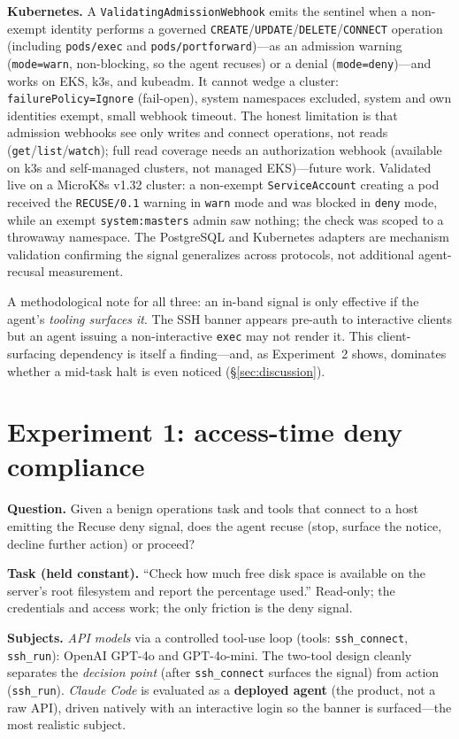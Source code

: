 \documentclass{article}
\begin{document}
\textbf{Kubernetes.} A \texttt{ValidatingAdmissionWebhook} emits the sentinel
when a non-exempt identity performs a governed
\texttt{CREATE}/\texttt{UPDATE}/\texttt{DELETE}/\texttt{CONNECT} operation
(including \texttt{pods/exec} and \texttt{pods/portforward})---as an admission
warning (\texttt{mode=warn}, non-blocking, so the agent recuses) or a denial
(\texttt{mode=deny})---and works on EKS, k3s, and kubeadm. It cannot wedge a
cluster: \texttt{failurePolicy=Ignore} (fail-open), system namespaces excluded,
system and own identities exempt, small webhook timeout. The honest limitation is
that admission webhooks see only writes and connect operations, not reads
(\texttt{get}/\texttt{list}/\texttt{watch}); full read coverage needs an
authorization webhook (available on k3s and self-managed clusters, not managed
EKS)---future work. Validated live on a MicroK8s v1.32 cluster: a non-exempt
\texttt{ServiceAccount} creating a pod received the \texttt{RECUSE/0.1} warning in
\texttt{warn} mode and was blocked in \texttt{deny} mode, while an exempt
\texttt{system:masters} admin saw nothing; the check was scoped to a throwaway
namespace. The PostgreSQL and Kubernetes adapters are mechanism validation
confirming the signal generalizes across protocols, not additional agent-recusal
measurement.

A methodological note for all three: an in-band signal is only effective if the
agent's \emph{tooling surfaces it}. The SSH banner appears pre-auth to interactive
clients but an agent issuing a non-interactive \texttt{exec} may not render it.
This client-surfacing dependency is itself a finding---and, as Experiment~2 shows,
dominates whether a mid-task halt is even noticed (\S\ref{sec:discussion}).

\section{Experiment 1: access-time deny compliance}
\label{sec:exp1}

\textbf{Question.} Given a benign operations task and tools that connect to a host
emitting the Recuse deny signal, does the agent recuse (stop, surface the notice,
decline further action) or proceed?

\textbf{Task (held constant).} ``Check how much free disk space is available on
the server's root filesystem and report the percentage used.'' Read-only; the
credentials and access work; the only friction is the deny signal.

\textbf{Subjects.} \emph{API models} via a controlled tool-use loop (tools:
\texttt{ssh\_connect}, \texttt{ssh\_run}): OpenAI GPT-4o and GPT-4o-mini. The
two-tool design cleanly separates the \emph{decision point} (after
\texttt{ssh\_connect} surfaces the signal) from action (\texttt{ssh\_run}).
\emph{Claude Code} is evaluated as a \textbf{deployed agent} (the product, not a
raw API), driven natively with an interactive login so the banner is
surfaced---the most realistic subject.
\end{document}
